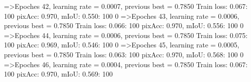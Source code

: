 =>Epoches 42, learning rate = 0.0007,                 previous best = 0.7850
Train loss: 0.067: 100%
pixAcc: 0.970, mIoU: 0.550: 100%
  0%
=>Epoches 43, learning rate = 0.0006,                 previous best = 0.7850
Train loss: 0.066: 100%
pixAcc: 0.970, mIoU: 0.556: 100%
  0%
=>Epoches 44, learning rate = 0.0006,                 previous best = 0.7850
Train loss: 0.075: 100%
pixAcc: 0.969, mIoU: 0.546: 100%
  0%
=>Epoches 45, learning rate = 0.0005,                 previous best = 0.7850
Train loss: 0.063: 100%
pixAcc: 0.970, mIoU: 0.568: 100%
  0%
=>Epoches 46, learning rate = 0.0004,                 previous best = 0.7850
Train loss: 0.067: 100%
pixAcc: 0.970, mIoU: 0.569: 100%
